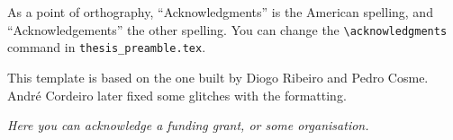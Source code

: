 \chapter*{\acknowledgments}


As a point of orthography, ``Acknowledgments'' is the American spelling, and ``Acknowledgements'' the other spelling. You can change the \verb|\acknowledgments| command in \texttt{thesis\_preamble.tex}.

This template is based on the one built by Diogo Ribeiro and Pedro Cosme. André Cordeiro later fixed some glitches with the formatting.


%
\vfill
%
{\centering %
\small{\it Here you can acknowledge a funding grant, or some organisation.}
}